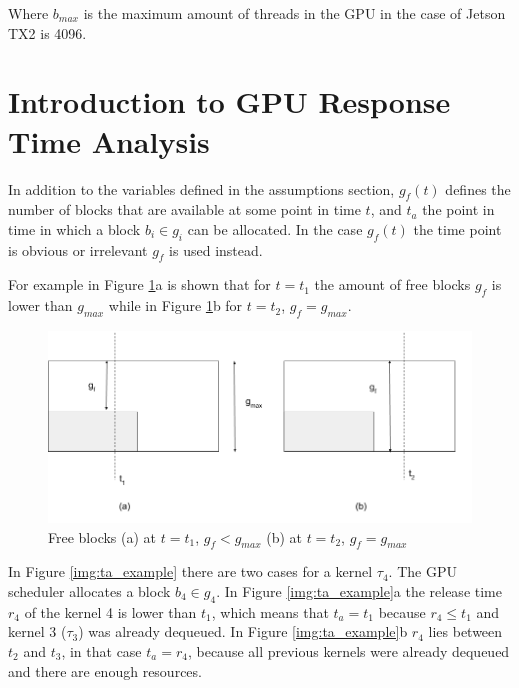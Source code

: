 \documentclass[
  12pt,
  a4paperpaper,
]{report}
\begin{document}
Where \(b_{max}\) is the maximum amount of threads in the GPU in the
case of Jetson TX2 is 4096.

\hypertarget{introduction-to-gpu-response-time-analysis}{%
\section{Introduction to GPU Response Time
Analysis}\label{introduction-to-gpu-response-time-analysis}}

In addition to the variables defined in the assumptions section, 
\(g_{f}(t)\) defines the number of blocks that are available at some point in
time \(t\), and \(t_a\) the point in time in which a block \(b_i \in g_i\) can be allocated.
In the case \(g_{f}(t)\) the time point is obvious or irrelevant \(g_{f}\) is used instead.

For example in Figure \ref{img:free_blocks}a is shown that for
\(t=t_1\) the amount of free blocks \(g_{f}\) is lower than \(g_{max}\)
while in Figure \ref{img:free_blocks}b for  \(t=t_2\),
\(g_{f} = g_{max}\).

\begin{figure}
\centering
\includegraphics{source/figures/free_blocks.png}
\caption{Free blocks (a) at \(t=t_1\), \(g_f < g_{max}\) (b) at
\(t=t_2\), \(g_f = g_{max}\) \label{img:free_blocks}}
\end{figure}

In Figure \ref{img:ta_example} there are two cases for a kernel \(\tau_4\). 
The GPU scheduler allocates a block \(b_4 \in g_4\). In
Figure \ref{img:ta_example}a the release time \(r_4\) of the kernel 4 is
lower than \(t_1\), which means that \(t_a = t_1\) because
\(r_4 \leq t_1\) and kernel 3 (\(\tau_3\)) was already dequeued. In Figure
\ref{img:ta_example}b \(r_4\) lies between \(t_2\) and \(t_3\), in that
case \(t_a = r_4\), because all previous kernels were already dequeued
and there are enough resources.
\end{document}
